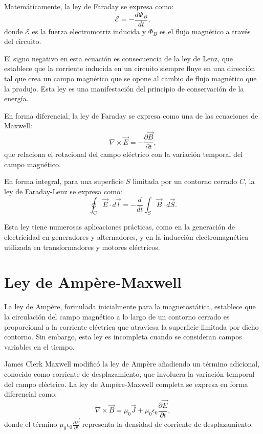 \documentclass[12pt,a4paper]{book}
\begin{document}
Matemáticamente, la ley de Faraday se expresa como:
\begin{equation}
\mathcal{E} = -\frac{d\Phi_B}{dt},
\end{equation}
donde $\mathcal{E}$ es la fuerza electromotriz inducida y $\Phi_B$ es el flujo magnético a través del circuito.

El signo negativo en esta ecuación es consecuencia de la ley de Lenz, que establece que la corriente inducida en un circuito siempre fluye en una dirección tal que crea un campo magnético que se opone al cambio de flujo magnético que la produjo. Esta ley es una manifestación del principio de conservación de la energía.

En forma diferencial, la ley de Faraday se expresa como una de las ecuaciones de Maxwell:
\begin{equation}
\nabla \times \vec{E} = -\frac{\partial \vec{B}}{\partial t},
\end{equation}
que relaciona el rotacional del campo eléctrico con la variación temporal del campo magnético.

En forma integral, para una superficie $S$ limitada por un contorno cerrado $C$, la ley de Faraday-Lenz se expresa como:
\begin{equation}
\oint_C \vec{E} \cdot d\vec{l} = -\frac{d}{dt} \int_S \vec{B} \cdot d\vec{S}.
\end{equation}

Esta ley tiene numerosas aplicaciones prácticas, como en la generación de electricidad en generadores y alternadores, y en la inducción electromagnética utilizada en transformadores y motores eléctricos.

\section{Ley de Ampère-Maxwell}

La ley de Ampère, formulada inicialmente para la magnetostática, establece que la circulación del campo magnético a lo largo de un contorno cerrado es proporcional a la corriente eléctrica que atraviesa la superficie limitada por dicho contorno. Sin embargo, esta ley es incompleta cuando se consideran campos variables en el tiempo.

James Clerk Maxwell modificó la ley de Ampère añadiendo un término adicional, conocido como corriente de desplazamiento, que involucra la variación temporal del campo eléctrico. La ley de Ampère-Maxwell completa se expresa en forma diferencial como:
\begin{equation}
\nabla \times \vec{B} = \mu_0 \vec{J} + \mu_0 \epsilon_0 \frac{\partial \vec{E}}{\partial t},
\end{equation}
donde el término $\mu_0 \epsilon_0 \frac{\partial \vec{E}}{\partial t}$ representa la densidad de corriente de desplazamiento.
\end{document}
